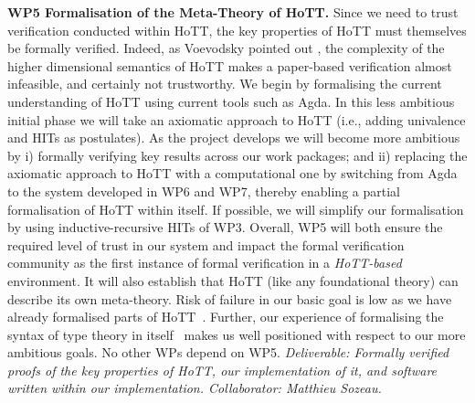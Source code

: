 \documentclass[a4paper,11pt]{article}
\begin{document}
{\bf WP5 Formalisation of the Meta-Theory of HoTT.}  Since we need to
trust verification conducted within HoTT, the key properties of HoTT
must themselves be formally verified. Indeed, as Voevodsky pointed out
\cite{voevodsky-ias14}, the complexity of the higher dimensional
semantics of HoTT makes a paper-based verification almost infeasible,
and certainly not trustworthy. We begin by formalising the current
understanding of HoTT using current tools such as Agda. In this less
ambitious initial phase we will take an axiomatic approach to HoTT
(i.e., adding univalence and HITs as postulates). As the project
develops we will become more ambitious by i) formally verifying key
results across our work packages; and ii) replacing the axiomatic
approach to HoTT with a computational one by switching from Agda to
the system developed in WP6 and WP7, thereby enabling a partial
formalisation of HoTT within itself. If possible, we will simplify our
formalisation by using inductive-recursive HITs of WP3.  Overall, WP5
will both ensure the required level of trust in our system and impact
the formal verification community as the first instance of formal
verification in a {\em HoTT-based} environment. It will also establish
that HoTT (like any foundational theory) can describe its own
meta-theory. Risk of failure in our basic goal is low as we have
already formalised parts of
HoTT~\cite{alti:csl12,AltenkirchLiRypacek14}. Further, our experience
of formalising the syntax of type theory in
itself~\cite{mcbride:outrageous,ghani:fibredIR,alti:catind2} makes us
well positioned with respect to our more ambitious goals. No other WPs
depend on WP5. {\em Deliverable: Formally verified proofs of
  the key properties of HoTT, our implementation of it, and software
  written within our implementation. Collaborator: Matthieu Sozeau.  }
\end{document}
